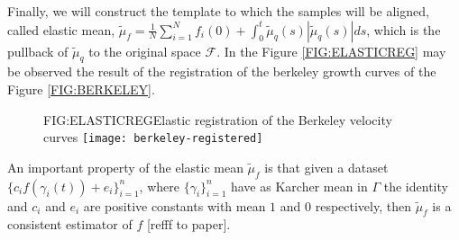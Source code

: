 Finally, we will construct the template to which the samples will be aligned,
called elastic mean,
$\tilde \mu_f = \frac{1}{N} \sum_{i=1}^N f_i(0) +
\int_0^t \tilde \mu_q(s) | \tilde \mu_q(s)| ds$,
which is the pullback of $\tilde \mu_q$ to the original space $\mathscr{F}$. In
the Figure \ref{FIG:ELASTICREG} may be observed the result of the registration of the
berkeley growth curves of the Figure \ref{FIG:BERKELEY}.

\begin{figure}[Elastic registration of the Berkeley velocity curves]{FIG:ELASTICREG}{Elastic registration of the Berkeley velocity curves}
  \texttt{[image: berkeley-registered]}
\end{figure}

An important property of the elastic mean
$\tilde \mu_f$ is that given a dataset $\{c_i f(\gamma_i(t)) + e_i\}_{i=1}^{n}$, where
$\{\gamma_i\}_{i=1}^{n}$ have as Karcher mean in $\Gamma$ the identity and $c_i$ and $e_i$ are positive
constants with mean $1$ and $0$ respectively, then $\tilde \mu_f$ is a
consistent estimator of $f$ [refff to paper].
